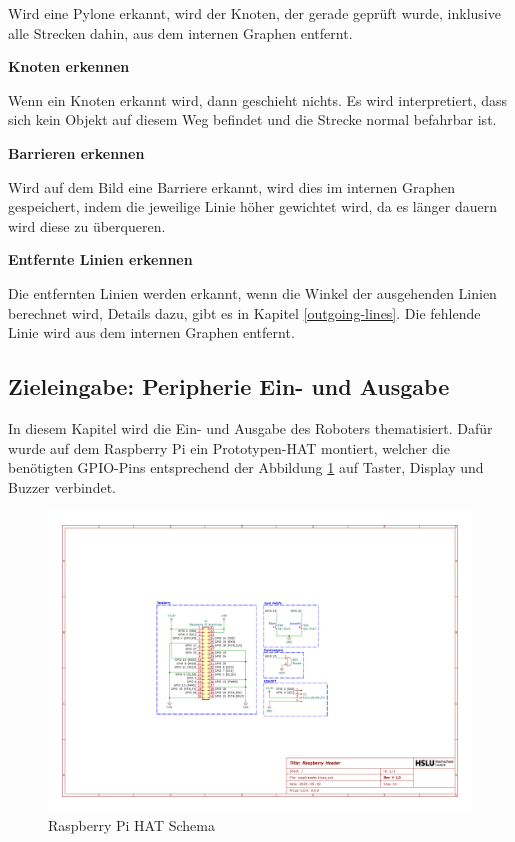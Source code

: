 Wird eine Pylone erkannt, wird der Knoten, der gerade geprüft wurde, inklusive alle Strecken dahin, aus dem internen Graphen entfernt.

\textbf{Knoten erkennen}

Wenn ein Knoten erkannt wird, dann geschieht nichts. Es wird interpretiert, dass sich kein Objekt auf diesem Weg befindet und die Strecke normal befahrbar ist.

\textbf{Barrieren erkennen}

Wird auf dem Bild eine Barriere erkannt, wird dies im internen Graphen gespeichert, indem die jeweilige Linie höher gewichtet wird, da es länger dauern wird diese zu überqueren.

\textbf{Entfernte Linien erkennen}

Die entfernten Linien werden erkannt, wenn die Winkel der ausgehenden Linien berechnet wird, Details dazu, gibt es in Kapitel \ref{outgoing-lines}. Die fehlende Linie wird aus dem internen Graphen entfernt.

\newpage
\subsection{Zieleingabe: Peripherie Ein- und Ausgabe}

In diesem Kapitel wird die Ein- und Ausgabe des Roboters thematisiert.
Dafür wurde auf dem Raspberry Pi ein Prototypen-HAT montiert, welcher die benötigten GPIO-Pins entsprechend der Abbildung \ref{fig:raspiheader-schema} auf Taster, Display und Buzzer verbindet.

\begin{figure}[H]
    \centering
    \includegraphics[width=\linewidth, trim=7.5cm 6cm 10cm 6cm, clip]{assets/ET/PCB/raspiheader.pdf}
    \caption{Raspberry Pi HAT Schema}
    \label{fig:raspiheader-schema}
\end{figure}

